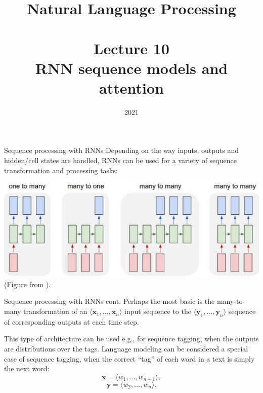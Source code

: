 \documentclass[style=upen, size=14pt]{powerdot}
\theoremstyle{definition}
\begin{document}
\title{Natural Language Processing\\~~\\Lecture 10\\RNN sequence models and
  attention}

\date{2021}
\maketitle

\begin{slide}[toc= RNN seq processing]{Sequence processing with RNNs}
  Depending on the way inputs, outputs and hidden/cell states are handled, RNNs
  can be used for a variety of sequence transformation and processing tasks:
  \begin{center}
    \includegraphics[width=1\textwidth]{figures/rnn_topologies.eps}
    \footnotesize{(Figure from \cite{karpathy2015unreasonable}).}
  \end{center}
\end{slide}

\begin{slide}[toc=]{Sequence processing with RNNs cont.}
  Perhaps the most basic is the many-to-many transformation of an
  $\langle \mathbf{x}_1,\dots,\mathbf{x}_n \rangle$ input sequence to the
  $\langle \mathbf{y}_1,\dots,\mathbf{y}_n\rangle$ sequence of corresponding
  outputs at each time step.

  This type of architecture can be used e.g., for sequence tagging, when the
  outputs are distributions over the tags. Language modeling can be considered a
  special case of sequence tagging, when the correct ``tag'' of each word in a text is
  simply the next word:
  $$
  \mathbf{x} = \langle w_1,\dots,w_{n-1}\rangle,
  $$
  $$
  \mathbf{y} = \langle w_2,\dots,w_{n}\rangle.
  $$
\end{slide}
\end{document}
